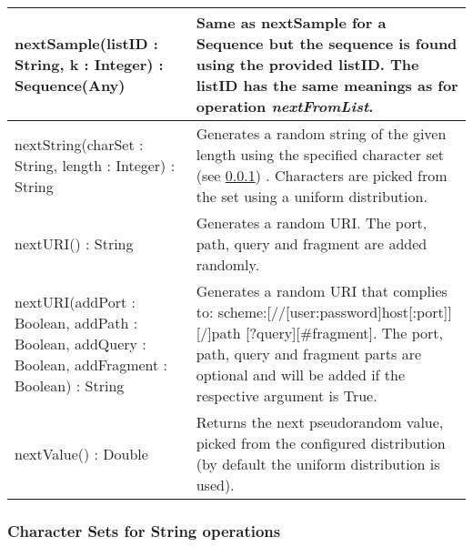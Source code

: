 \begin{longtabu} {|p{6.5cm}|X|}
	nextSample(listID : String, k : Integer) : Sequence(Any) & Same as nextSample for a Sequence but the sequence is found using the provided listID. The listID has the same meanings as for operation \emph{nextFromList}.\\\hline
	
	nextString(charSet : String, length : Integer) : String &  Generates a random string of the given length using the specified character set (see \ref{sec:emg.charsets}) . Characters are picked from the set using a uniform distribution.\\\hline
	
	nextURI() : String & Generates a random URI. The port, path, query and fragment are added randomly.\\\hline
	
	nextURI(addPort : Boolean, addPath : Boolean, addQuery : Boolean, addFragment : Boolean) : String & Generates a random URI that complies to: scheme:[//[user:password\@]host[:port]][/]path [?query][\#fragment]. The port, path, query and fragment parts are optional and will be added if the respective argument is True.\\\hline
	
	nextValue() : Double & Returns the next pseudorandom value, picked from the configured distribution (by default the uniform distribution is used).\\\hline	
\end{longtabu}

\subsubsection{Character Sets for String operations}\label{sec:emg.charsets}

